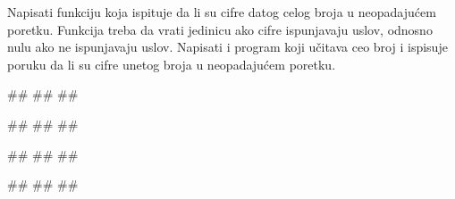 \begin{Exercise}[label=FUN_16] 
Napisati funkciju  koja ispituje da li su
cifre datog celog broja u neopadajućem poretku. Funkcija treba da vrati
jedinicu ako cifre ispunjavaju uslov, odnosno nulu ako ne
ispunjavaju uslov. Napisati i program koji učitava ceo broj i ispisuje
poruku da li su cifre unetog broja u neopadajućem poretku.

\begin{miditest}
\begin{upotreba}{1}
#\naslovInt#
##
##
\end{upotreba}
\end{miditest}
\begin{miditest}
\begin{upotreba}{2}
#\naslovInt#
##
##
\end{upotreba}
\end{miditest}

\begin{miditest}
\begin{upotreba}{3}
#\naslovInt#
##
##
\end{upotreba}
\end{miditest}
\begin{miditest}
\begin{upotreba}{4}
#\naslovInt#
##
##
\end{upotreba}
\end{miditest}

\end{Exercise}
\ifresenja 
\begin{Answer}[ref=FUN_16]
\end{Answer} 
\fi


